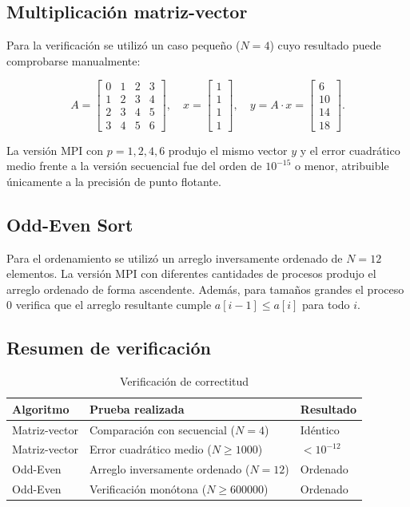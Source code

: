 \documentclass[12pt,a4paper]{article}
\begin{document}
\subsection{Multiplicación matriz-vector}

Para la verificación se utilizó un caso pequeño ($N=4$) cuyo resultado puede comprobarse manualmente:

\[
A = \begin{bmatrix}
0 & 1 & 2 & 3 \\
1 & 2 & 3 & 4 \\
2 & 3 & 4 & 5 \\
3 & 4 & 5 & 6
\end{bmatrix},
\quad
x = \begin{bmatrix}1\\1\\1\\1\end{bmatrix},
\quad
y = A \cdot x = \begin{bmatrix}6\\10\\14\\18\end{bmatrix}.
\]

La versión MPI con $p=1,2,4,6$ produjo el mismo vector $y$ y el error cuadrático medio frente a la versión secuencial fue del orden de $10^{-15}$ o menor, atribuible únicamente a la precisión de punto flotante.

\subsection{Odd-Even Sort}

Para el ordenamiento se utilizó un arreglo inversamente ordenado de $N=12$ elementos. La versión MPI con diferentes cantidades de procesos produjo el arreglo ordenado de forma ascendente. Además, para tamaños grandes el proceso 0 verifica que el arreglo resultante cumple $a[i-1] \leq a[i]$ para todo $i$.

\subsection{Resumen de verificación}

\begin{table}[htbp]
\centering
\caption{Verificación de correctitud}
\label{tab:correctitud}
\begin{tabular}{@{}lll@{}}
\toprule
Algoritmo & Prueba realizada & Resultado \\
\midrule
Matriz-vector & Comparación con secuencial ($N=4$) & Idéntico \\
Matriz-vector & Error cuadrático medio ($N \geq 1000$) & $< 10^{-12}$ \\
Odd-Even & Arreglo inversamente ordenado ($N=12$) & Ordenado \\
Odd-Even & Verificación monótona ($N \geq 600000$) & Ordenado \\
\bottomrule
\end{tabular}
\end{table}
\end{document}
